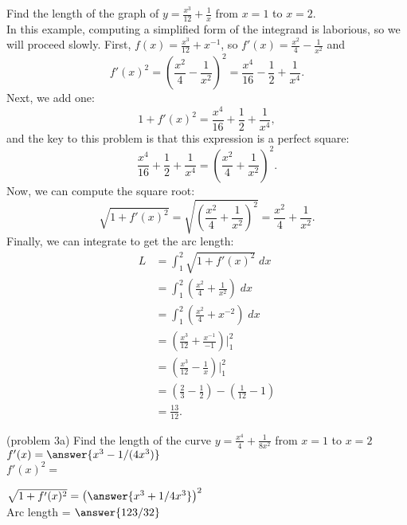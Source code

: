\documentclass{ximera}
\begin{document}
\begin{example} Find the length of the graph of 
$y = \frac{x^3}{12} + \frac{1}{x}$ from $x = 1$ to $x = 2$.\\
In this example, computing a simplified form of the integrand is laborious, so we will proceed slowly.
First, $f(x) = \frac{x^3}{12} + x^{-1}$, so $f'(x) = \frac{x^2}{4} - \frac{1}{x^2}$ and
\[
f'(x)^2 = \left( \frac{x^2}{4} - \frac{1}{x^2} \right)^2 = \frac{x^4}{16} - \frac12 + \frac{1}{x^4}.
\]
Next, we add one:
\[
1 + f'(x)^2 = \frac{x^4}{16} + \frac12 + \frac{1}{x^4},
\]
and the key to this problem is that this expression is a perfect square:
\[
\frac{x^4}{16} + \frac12 + \frac{1}{x^4} = \left( \frac{x^2}{4} + \frac{1}{x^2}\right)^2.
\]
Now, we can compute the square root:
\[
\sqrt{1+f'(x)^2} = \sqrt{\left( \frac{x^2}{4} + \frac{1}{x^2}\right)^2 } = \frac{x^2}{4} + \frac{1}{x^2}.
\]
Finally, we can integrate to get the arc length:
\begin{align*}
L &= \int_1^2 \sqrt{1+f'(x)^2} \; dx \\
  &= \int_1^2 \left(\frac{x^2}{4} + \frac{1}{x^2} \right) \; dx  \\
  &= \int_1^2 \left(\frac{x^2}{4} + x^{-2} \right) \; dx \\
  &= \left(\frac{x^3}{12} + \frac{x^{-1}}{-1} \right) \bigg|_1^2 \\
  &= \left(\frac{x^3}{12} - \frac{1}{x} \right) \bigg|_1^2 \\
  &= \left(\frac23 - \frac12\right) - \left(\frac{1}{12} - 1\right) \\
  &= \frac{13}{12}.  
\end{align*}
\end{example}




\begin{problem}(problem 3a)
Find the length of the curve $\displaystyle{y = \frac{x^4}{4} + \frac{1}{8x^2}}$ from $x = 1$ to $x = 2$\\

$f'(x) = \answer{x^3 - 1/(4x^3)}$\\

$f'(x)^2 =$

\begin{multipleChoice}
\end{multipleChoice}

$\sqrt{1+f'(x)^2} = \left(\answer{x^3 + 1/4x^3}\right)^2$\\

Arc length = $\answer{123/32}$
\end{problem}
\end{document}
